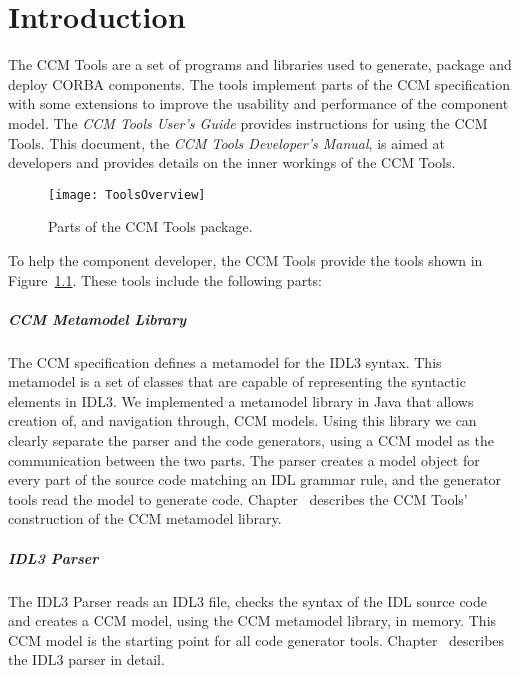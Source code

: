 \chapter{Introduction}
\label{chapter:introduction}

The CCM Tools are a set of programs and libraries used to generate, package and
deploy CORBA components. The tools implement parts of the CCM specification
\cite{CCMSpecification} with some extensions to improve the usability and
performance of the component model. The {\it CCM Tools User's Guide\/} provides
instructions for using the CCM Tools. This document, the {\it CCM Tools
Developer's Manual\/}, is aimed at developers and provides details on the inner
workings of the CCM Tools.

\begin{figure}
\centering \texttt{[image: ToolsOverview]}
\caption{Parts of the CCM Tools package.}
\label{fig:intro-ToolsOverview}
\end{figure}

To help the component developer, the CCM Tools provide the tools shown in
Figure~\ref{fig:intro-ToolsOverview}. These tools include the following parts:

\paragraph{CCM Metamodel Library}

The CCM specification defines a metamodel for the IDL3 syntax. This metamodel is
a set of classes that are capable of representing the syntactic elements in
IDL3. We implemented a metamodel library in Java that allows creation of, and
navigation through, CCM models. Using this library we can clearly separate the
parser and the code generators, using a CCM model as the communication between
the two parts. The parser creates a model object for every part of the source
code matching an IDL grammar rule, and the generator tools read the model to
generate code. Chapter~\cite{chapter:ccm-metamodel-library} describes the CCM
Tools' construction of the CCM metamodel library.

\paragraph{IDL3 Parser}

The IDL3 Parser reads an IDL3 file, checks the syntax of the IDL source code and
creates a CCM model, using the CCM metamodel library, in memory. This CCM model
is the starting point for all code generator tools.
Chapter~\cite{chapter:idl3-parser} describes the IDL3 parser in detail.


